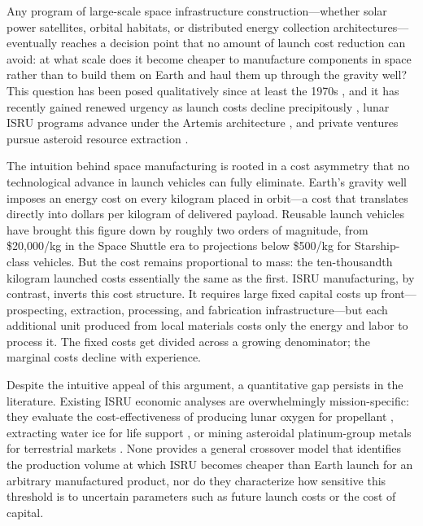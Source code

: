 \documentclass[preprint,12pt]{elsarticle}
\begin{document}
Any program of large-scale space infrastructure construction---whether solar power satellites, orbital habitats, or distributed energy collection architectures---eventually reaches a decision point that no amount of launch cost reduction can avoid: at what scale does it become cheaper to manufacture components in space rather than to build them on Earth and haul them up through the gravity well? This question has been posed qualitatively since at least the 1970s \cite{oneill1974,oneill1976}, and it has recently gained renewed urgency as launch costs decline precipitously \cite{jones2018}, lunar ISRU programs advance under the Artemis architecture \cite{sanders2015}, and private ventures pursue asteroid resource extraction \cite{elvis2012,andrews2015}.

The intuition behind space manufacturing is rooted in a cost asymmetry that no technological advance in launch vehicles can fully eliminate. Earth's gravity well imposes an energy cost on every kilogram placed in orbit---a cost that translates directly into dollars per kilogram of delivered payload. Reusable launch vehicles have brought this figure down by roughly two orders of magnitude, from \$20{,}000/kg in the Space Shuttle era to projections below \$500/kg for Starship-class vehicles. But the cost remains proportional to mass: the ten-thousandth kilogram launched costs essentially the same as the first. ISRU manufacturing, by contrast, inverts this cost structure. It requires large fixed capital costs up front---prospecting, extraction, processing, and fabrication infrastructure---but each additional unit produced from local materials costs only the energy and labor to process it. The fixed costs get divided across a growing denominator; the marginal costs decline with experience.

Despite the intuitive appeal of this argument, a quantitative gap persists in the literature. Existing ISRU economic analyses are overwhelmingly mission-specific: they evaluate the cost-effectiveness of producing lunar oxygen for propellant \cite{sanders2015}, extracting water ice for life support \cite{zubrin1996}, or mining asteroidal platinum-group metals for terrestrial markets \cite{sonter1997,elvis2012}. None provides a general crossover model that identifies the production volume at which ISRU becomes cheaper than Earth launch for an arbitrary manufactured product, nor do they characterize how sensitive this threshold is to uncertain parameters such as future launch costs or the cost of capital.
\end{document}
